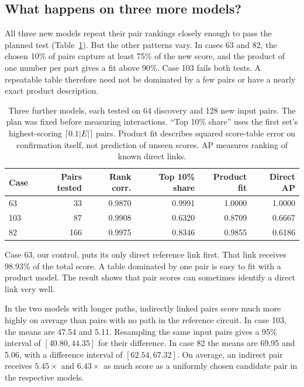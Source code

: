 \documentclass[11pt]{article}
\begin{document}
\subsection{What happens on three more models?}
All three new models repeat their pair rankings closely enough to pass the
planned test (Table~\ref{tab:fresh}). But the other patterns vary. In cases 63
and 82, the chosen 10\% of pairs capture at least 75\% of the new score, and
the product of one number per part gives a fit above 90\%. Case 103 fails
both tests. A repeatable table therefore need not be dominated by a few pairs
or have a nearly exact product description.

\begin{table}[t]
\centering
\caption{Three further models, each tested on 64 discovery and 128 new input
pairs. The plan was fixed before measuring interactions. ``Top 10\% share''
uses the first set's highest-scoring $\lceil0.1|E|\rceil$ pairs. Product fit
describes squared score-table error on confirmation itself, not prediction of
unseen scores. AP measures ranking of known direct links.}
\label{tab:fresh}
\begin{tabular}{lrrrrr}
\toprule
Case & Pairs tested & Rank corr. & Top 10\% share & Product fit & Direct AP\\
\midrule
63  & 33  & 0.9870 & 0.9991 & 1.0000 & 1.0000\\
103 & 87  & 0.9908 & 0.6320 & 0.8709 & 0.6667\\
82  & 166 & 0.9975 & 0.8346 & 0.9855 & 0.6186\\
\bottomrule
\end{tabular}
\end{table}

Case 63, our control, puts its only direct reference link first. That link
receives 98.93\% of the total score. A table dominated by one pair is easy to
fit with a product model. The result shows that pair scores can sometimes
identify a direct link very well.

In the two models with longer paths, indirectly linked pairs score much more
highly on average than pairs with no path in the reference circuit. In case
103, the means are 47.54 and 5.11. Resampling the same input pairs gives a
95\% interval of $[40.80,44.35]$ for their difference. In case 82 the means
are 69.95 and 5.06, with a difference interval of $[62.54,67.32]$. On average,
an indirect pair receives $5.45\times$ and $6.43\times$ as much score as a
uniformly chosen candidate pair in the respective models.
\end{document}

